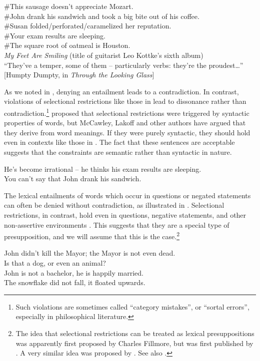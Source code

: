 \ea \label{ex:7.9}
\ea \#This sausage doesn’t appreciate Mozart.\\
\ex \#John drank his sandwich and took a big bite out of his coffee.\\
\ex \#Susan folded/perforated/caramelized her reputation.\\
\ex \#Your exam results are sleeping.\\
\ex \#The square root of oatmeal is Houston.\\
\ex \textit{My Feet Are Smiling} (title of guitarist Leo Kottke’s sixth album)\\
\ex “They’ve a temper, some of them – particularly verbs: they’re the proudest…”
\small \hfill [Humpty Dumpty, in \textit{Through the Looking Glass}]
                       \z
\z


As we noted in , denying an entailment leads to a contradiction. In contrast, violations of selectional restrictions like those in  lead to dissonance rather than contradiction.\footnote{Such violations are sometimes called “category mistakes”, or “sortal errors”, especially in philosophical literature.} \citet[95]{Chomsky1965} proposed that selectional restrictions were triggered by syntactic properties of words, but McCawley, Lakoff and other authors have argued that they derive from word meanings. If they were purely syntactic, they should hold even in contexts like those in . The fact that these sentences are acceptable suggests that the constraints are semantic rather than syntactic in nature.

\ea \label{ex:7.10}
\ea He’s become irrational – he thinks his exam results are sleeping.\\
\ex You can’t say that John drank his sandwich.
                       \z
\z

The lexical entailments of words which occur in questions or negated statements can often be denied without contradiction, as illustrated in . Selectional restrictions, in contrast, hold even in questions, negative statements, and other non-assertive environments . This suggests that they are a special type of presupposition, and we will assume that this is the case.\footnote{The idea that selectional restrictions can be treated as lexical presuppositions was apparently first proposed by Charles Fillmore, but was first published by \citet{McCawley1968}. A very similar idea was proposed by \citet{Pap1960}. See also \citet{Cruse1986}. }


\ea \label{ex:7.11}
\ea John didn’t kill the Mayor; the Mayor is not even dead.\\
\ex Is that a dog, or even an animal?\\
\ex John is not a bachelor, he is happily married.\\
\ex The snowflake did not fall, it floated upwards.
                       \z
\z

